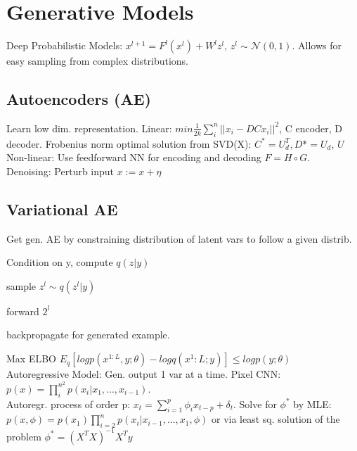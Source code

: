 \section{Generative Models}
Deep Probabilistic Models: $x^{l+1} = F^l(x^l) + W^l z^l$, $z^{l}\sim \mathcal{N}(0,1)$. Allows for easy sampling from complex distributions.
\subsection{Autoencoders (AE)}
Learn low dim. representation. 
Linear: $min \frac{1}{2k} \sum_{i}^n ||x_i - DCx_i||^2$, C encoder, D decoder. Frobenius norm optimal solution from SVD(X): $C^*=U_d^T, D*=U_d$, $U$
Non-linear: Use feedforward NN for encoding and decoding $F = H \circ G$. \\
Denoising: Perturb input $x := x + \eta$
\subsection{Variational AE}
Get gen. AE by constraining distribution of latent vars to follow a given distrib.
\begin{inparaenum}
	\item Condition on y, compute $q(z|y)$
	\item sample $z^l \sim q(z^l|y)$
	\item forward $2^l$
	\item backpropagate for generated example.
\end{inparaenum}
Max ELBO $E_q[log p(x^{1:L},y;\theta) - log q(x^1:L;y)] \leq log p (y;\theta)$ \\
Autoregressive Model: Gen. output 1 var at a time. 
Pixel CNN: $p(x) = \prod_i^{n^2} p(x_i|x_1,...,x_{i-1})$. \\
Autoregr. process of order p: $x_t = \sum_{i=1}^p \phi_i x_{t-p} + \delta_t$.
Solve for $\phi^*$ by MLE: $p(x, \phi) = p(x_1)\prod_{i=2}^n p(x_i|x_{i-1},...,x_1,\phi)$ or via least sq. solution of the problem $\phi^* = (X^TX)^{-1}X^Ty$